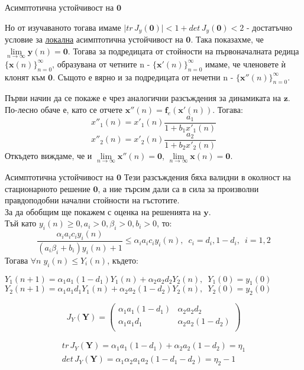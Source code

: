   \begin{frame}[t]{Асимптотична устойчивост на $\mathbf{0}$}

    Но от изучаваното тогава имаме $\lvert tr \, J_{y}(\mathbf{0}) \rvert < 1 + det \, J_{y}(\mathbf{0}) < 2$ - достатъчно условие за \underline{локална} асимптотична устойчивост на $\mathbf{0}$. Така показахме, че $\lim\limits_{n \to \infty} \mathbf{y}(n) = \mathbf{0}$. Тогава за подредицата от стойности на първоначалната редица $\{\mathbf{x}(n)\}_{n=0}^{\infty}$, образувана от четните n  - $\{\mathbf{x}'(n)\}_{n=0}^{\infty}$ имаме, че членовете ѝ клонят към $\mathbf{0}$.
    Същото е вярно и за подредицата от нечетни n - $\{\mathbf{x}''(n)\}_{n=0}^{\infty}$.

    Първи начин да се покаже е чрез аналогични разсъждения за динамиката на $\mathbf{z}$. По-лесно обаче е, като се отчете $\mathbf{x}''(n)=\mathbf{f}_{e}(\mathbf{x}'(n))$. Тогава:
    \[x''_{1}(n)=x'_{1}(n)\frac{a_{1}}{1+b_{1} x'_{1}(n)}\]
    \[x''_{2}(n)=x'_{2}(n)\frac{a_{2}}{1+b_{2} x'_{2}(n)}\]
    Откъдето виждаме, че и $\lim\limits_{n \to \infty}\mathbf{x''}(n) = \mathbf{0}$, $\lim\limits_{n \to \infty}\mathbf{x}(n) = \mathbf{0}$.

  \end{frame}

  \begin{frame}[t]{Асимптотична устойчивост на $\mathbf{0}$}
    Тези разсъждения бяха валидни в околност на стационарното решение $\mathbf{0}$, а ние търсим дали са в сила за произволни правдоподобни начални стойности на гъстотите. \\
    За да обобщим ще покажем с оценка на решенията на $\mathbf{y}$. \\
    Тъй като $y_{i}(n) \geq 0, a_{i} > 0, \beta_{i} > 0, b_{i}>0$, то:
    \[\frac{\alpha_{i} a_{i} c_{i} y_{i}(n)}{(a_{i} \beta_{i} + b_{i}) y_{i}(n) + 1} \leq
    \alpha_{i} a_{i} c_{i} y_{i}(n),\enspace c_{i}=d_{i},1-d_{i}, \enspace i=1,2\]
    Тогава $\forall{n} \; y_{i}(n) \leq Y_{i}(n)$, където:

    $Y_{1}(n+1)=\alpha_{1} a_{1} (1-d_{1}) Y_{1}(n) + \alpha_{2} a_{2} d_{2} Y_{2}(n), \enspace Y_{1}(0)=y_{1}(0)$ \\
    $Y_{2}(n+1)=\alpha_{1} a_{1} d_{1} Y_{1}(n) +
    \alpha_{2} a_{2} (1-d_{2}) Y_{2}(n), \enspace Y_{2}(0)=y_{2}(0)$

    \[J_{Y}(\mathbf{Y})=\left(
        \begin{array}{cc}
          \alpha_{1} a_{1} (1-d_{1}) & \alpha_{2} a_{2} d_{2}
          \\
          \alpha_{1} a_{1} d_{1} & \alpha_{2} a_{2} (1-d_{2})
          \\
        \end{array}
    \right)\]

    \[
      \begin{array}{c}
        tr \, J_{Y}(\mathbf{Y}) = \alpha_{1} a_{1} (1-d_{1}) + \alpha_{2} a_{2} (1-d_{2}) = \eta_{1}  \\
        det \, J_{Y}(\mathbf{Y}) = \alpha_{1} \alpha_{2} a_{1} a_{2} (1 - d_{1} - d_{2}) = \eta_{2} - 1
    \end{array}\]

  \end{frame}


